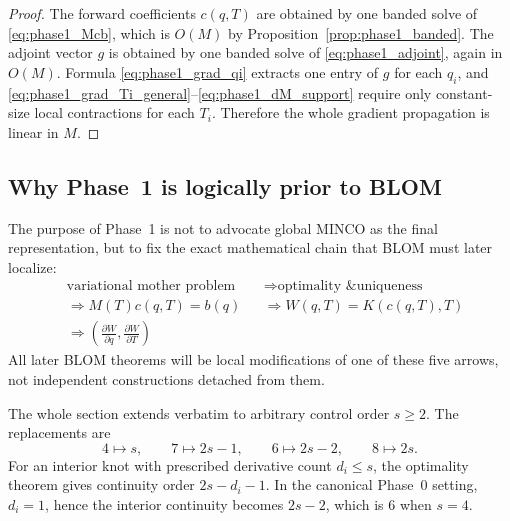 \begin{proof}
  The forward coefficients $c(q,T)$ are obtained by one banded solve of \eqref{eq:phase1_Mcb},
  which is $O(M)$ by Proposition~\ref{prop:phase1_banded}. The adjoint vector $g$ is obtained by
  one banded solve of \eqref{eq:phase1_adjoint}, again in $O(M)$. Formula
  \eqref{eq:phase1_grad_qi} extracts one entry of $g$ for each $q_i$, and
  \eqref{eq:phase1_grad_Ti_general}--\eqref{eq:phase1_dM_support} require only constant-size local
  contractions for each $T_i$. Therefore the whole gradient propagation is linear in $M$.
\end{proof}

\subsection{Why Phase~1 is logically prior to BLOM}
\label{subsec:phase1_prior_to_blom}

The purpose of Phase~1 is not to advocate global MINCO as the final representation, but to fix
the exact mathematical chain that BLOM must later localize:
\[
  \boxed{
    \begin{aligned}
      &\text{variational mother problem}
      &&\Longrightarrow\text{optimality \& uniqueness}\\
      &\Longrightarrow M(T)c(q,T)=b(q)
      &&\Longrightarrow W(q,T)=K(c(q,T),T)\\
      &\Longrightarrow\left(\frac{\partial W}{\partial q},\frac{\partial W}{\partial T}\right)
    \end{aligned}
  }
\]
All later BLOM theorems will be local modifications of one of these five arrows, not independent
constructions detached from them.

\begin{remark}
  \label{rem:phase1_general_s}
  The whole section extends verbatim to arbitrary control order $s\ge 2$.
  The replacements are
  \[
    4 \mapsto s,
    \qquad
    7 \mapsto 2s-1,
    \qquad
    6 \mapsto 2s-2,
    \qquad
    8 \mapsto 2s.
  \]
  For an interior knot with prescribed derivative count $d_i\le s$, the optimality theorem gives
  continuity order $2s-d_i-1$. In the canonical Phase~0 setting, $d_i=1$, hence the interior
  continuity becomes $2s-2$, which is $6$ when $s=4$.
\end{remark}